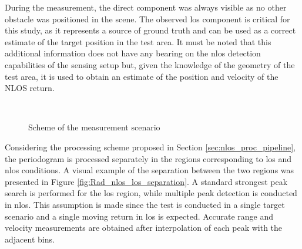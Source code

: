 During the measurement, the direct component was always visible as no other obstacle was positioned in the scene. 
The observed \gls{los} component is critical for this study, as it represents a source of ground truth and can be used as a correct estimate of the target position in the test area.
It must be noted that this additional information does not have any bearing on the \gls{nlos} detection capabilities of the sensing setup but, given 
the knowledge of the geometry of the test area, it is used to obtain an estimate of the position and velocity of the NLOS return. 

\begin{figure}[H]
	\centering
	
	\\
	\caption{Scheme of the measurement scenario}
	\label{fig:Test1_base_and_top_view}
\end{figure}

Considering the processing scheme proposed in Section \ref{sec:nlos_proc_pipeline}, the periodogram is processed separately in the regions corresponding to \gls{los} and \gls{nlos} conditions. A visual example of the separation between the two regions was presented in Figure \ref{fig:Rad_nlos_los_separation}.
A standard strongest peak search is performed for the \gls{los} region, while multiple peak detection is conducted in \gls{nlos}. This assumption is made since the test is conducted in a single target scenario and a single moving return in \gls{los} is expected.
Accurate range and velocity measurements are obtained after interpolation of each peak with the adjacent bins.


